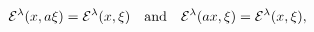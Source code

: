 \begin{equation}
{\cal E}^{\lambda}(x,a\xi)={\cal
E}^{\lambda}(x,\xi)\quad\mbox{and}\quad {\cal
E}^{\lambda}(ax,\xi)={\cal E}^{\lambda}(x,\xi), \nonumber
\end{equation}

